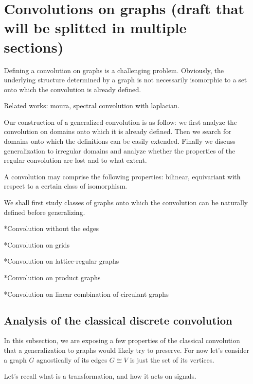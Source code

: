 \section{Convolutions on graphs (draft that will be splitted in multiple sections)}

Defining a convolution on graphs is a challenging problem. Obviously, the underlying structure determined by a graph is not necessarily isomorphic to a set onto which the convolution is already defined. 

Related works: moura, spectral convolution with laplacian.

Our construction of a generalized convolution is as follow: we first analyze the convolution on domains onto which it is already defined. Then we search for domains onto which the definitions can be easily extended. Finally we discuss generalization to irregular domains and analyze whether the properties of the regular convolution are lost and to what extent.

A convolution may comprise the following properties: bilinear, equivariant with respect to a certain class of isomorphism.

We shall first study classes of graphs onto which the convolution can be naturally defined before generalizing.

*Convolution without the edges

*Convolution on grids

*Convolution on lattice-regular graphs

*Convolution on product graphs

*Convolution on linear combination of circulant graphs


\subsection{Analysis of the classical discrete convolution}

In this subsection, we are exposing a few properties of the classical convolution that a generalization to graphs would likely try to preserve. For now let's consider a graph $G$ agnostically of its edges \ie $G \cong V$ is just the set of its vertices.

Let's recall what is a transformation, and how it acts on signals.

